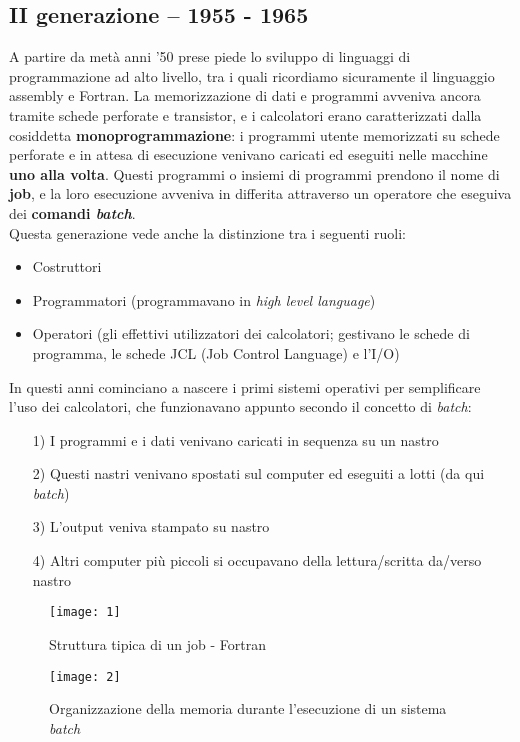 \documentclass[12pt, letterpaper]{article}
\begin{document}
\subsection{II generazione -- 1955 - 1965}
A partire da metà anni '50 prese piede lo sviluppo di linguaggi di programmazione ad alto livello, tra i quali ricordiamo sicuramente il linguaggio assembly e Fortran. La memorizzazione di dati e programmi avveniva ancora tramite schede perforate e transistor, e i calcolatori erano caratterizzati dalla cosiddetta \textbf{monoprogrammazione}: i programmi utente memorizzati su schede perforate e in attesa di esecuzione venivano caricati ed eseguiti nelle macchine \textbf{uno alla volta}. Questi programmi o insiemi di programmi prendono il nome di \textbf{job}, e la loro esecuzione avveniva in differita attraverso un operatore che eseguiva dei \textbf{comandi \textit{batch}}. \\
Questa generazione vede anche la distinzione tra i seguenti ruoli:
\begin{itemize}
\item Costruttori
\item Programmatori (programmavano in \textit{high level language})
\item Operatori (gli effettivi utilizzatori dei calcolatori; gestivano le schede di programma, le schede JCL (Job Control Language) e l'I/O)
\end{itemize}
In questi anni cominciano a nascere i primi sistemi operativi per semplificare l'uso dei calcolatori, che funzionavano appunto secondo il concetto di \textit{batch}:
\begin{itemize}
\item[1)] I programmi e i dati venivano caricati in sequenza su un nastro
\item[2)] Questi nastri venivano spostati sul computer ed eseguiti a lotti (da qui \textit{batch})
\item[3)] L'output veniva stampato su nastro
\item[4)] Altri computer più piccoli si occupavano della lettura/scritta da/verso nastro
\end{itemize}

\begin{figure}[h]
\caption{Struttura tipica di un job - Fortran}
\centering
\texttt{[image: 1]}
\end{figure}

\begin{figure}[h]
\caption{Organizzazione della memoria durante l'esecuzione di un sistema \textit{batch}}
\centering
\texttt{[image: 2]}
\end{figure}
\end{document}
